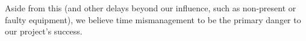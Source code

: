 \documentclass[a4paper,10pt]{article}
\begin{document}
\begin{description}[align=left]
        Aside  from this  (and  other  delays beyond  our  influence, such  as
        non-present or faulty equipment), we  believe time mismanagement to be
        the primary danger to our project's success.
\end{description}

%
%
%
\end{document}
